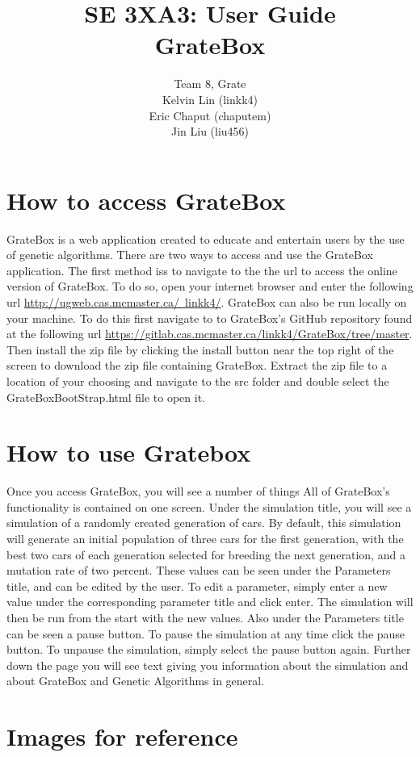 \documentclass{article}
\title{SE 3XA3: User Guide\\GrateBox}
\author{Team 8, Grate
		\\ Kelvin Lin (linkk4)
		\\ Eric Chaput (chaputem)
		\\ Jin Liu (liu456)
}
\date{}
\begin{document}
\newpage

\maketitle

\section{How to access GrateBox}

GrateBox is a web application created to educate and entertain users by the use of genetic algorithms. There are two ways to access and use the GrateBox application. The first method iss to navigate to the the url to access the online version of GrateBox. To do so, open your internet browser and enter the following url \href{http://ugweb.cas.mcmaster.ca/~linkk4/}{http://ugweb.cas.mcmaster.ca/~linkk4/}. GrateBox can also be run locally on your machine. To do this first navigate to to GrateBox's GitHub repository found at the following url \href{https://gitlab.cas.mcmaster.ca/linkk4/GrateBox/tree/master}{https://gitlab.cas.mcmaster.ca/linkk4/GrateBox/tree/master}. Then install the zip file by clicking the install button near the top right of the screen to download the zip file containing GrateBox. Extract the zip file to a location of your choosing and navigate to the src folder and double select the GrateBoxBootStrap.html file to open it.

\section {How to use Gratebox}

Once you access GrateBox, you will see a number of things All of GrateBox's functionality is contained on one screen. Under the simulation title, you will see a simulation of a randomly created generation of cars. By default, this simulation will generate an initial population of three cars for the first generation, with the best two cars of each generation selected for breeding the next generation, and a mutation rate of two percent. These values can be seen under the Parameters title, and can be edited by the user. To edit a parameter, simply enter a new value under the corresponding parameter title and click enter. The simulation will then be run from the start with the new values. Also under the Parameters title can be seen a pause button. To pause the simulation at any time click the pause button. To unpause the simulation, simply select the pause button again. Further down the page you will see text giving you information about the simulation and about GrateBox and Genetic Algorithms in general.

\section {Images for reference}
\end{document}
